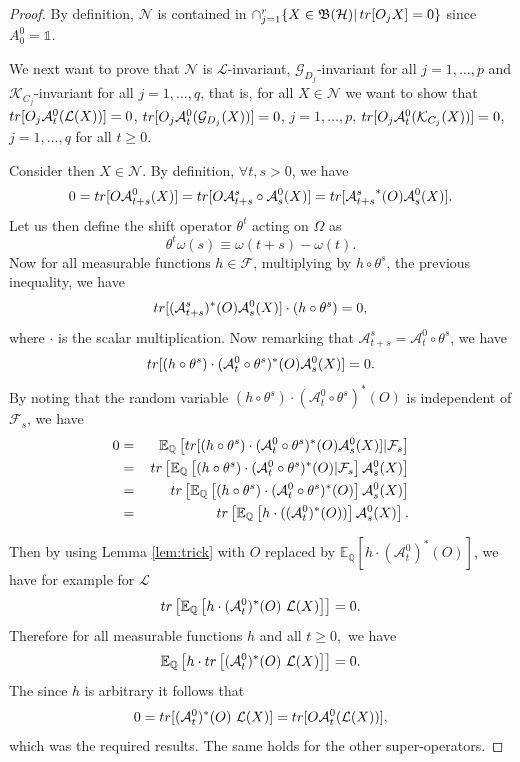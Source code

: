 \documentclass[aihp,12pt]{imsart}
\newcommand{\Gc}{\mathcal{G}}
\newcommand{\Hc}{\mathcal{H}}
\newcommand{\Kc}{\mathcal{K}}
\newcommand{\Lc}{\mathcal{L}}
\newcommand{\Ns}{\mathscr{N}}
\newcommand{\Bf}{\mathfrak{B}}
\newcommand{\one}{\mathbb{1}}
\newcommand{\tr}{{\rm tr}}
\theoremstyle{theorem}
\theoremstyle{definition}
\theoremstyle{remark}
\begin{document}
\begin{proof}
 By definition, $\Ns$ is contained in $\cap_{j=1}^r\{X\in\Bf(\Hc)|\, \tr[O_j X]=0\}$ since $A_{0}^0=\one$.

We next want to prove that $\Ns$ is $\Lc$-invariant, $\Gc_{D_j}$-invariant for all $j=1,\dots,p$ and $\Kc_{C_j}$-invariant for all $j=1,\dots,q$, that is, for all $X\in\Ns$ we want to show that $\tr[O_j\mathcal A_t^0(\Lc(X))]=0$, $\tr[O_j\mathcal A_t^0(\Gc_{D_j}(X))]=0$, $j=1,\ldots,p$, $\tr[O_j\mathcal A_t^0(\Kc_{C_j}(X))]=0$, $j=1,\ldots,q$  for all $t\geq0$.

Consider then $X\in\Ns$. By definition, $\forall t,s>0$,  we have 
    \begin{eqnarray*}
    0=\tr[O \mathcal A_{t+s}^0(X)]
    =\tr[O \mathcal A_{t+s}^s\circ{\mathcal A_s^0}(X)]
    =\tr[{\mathcal A_{t+s}^s}^* (O){\mathcal A_s^0}(X)].
    \end{eqnarray*} 
Let us then define the shift operator $\theta^t$ acting on $\Omega$ as
$$\theta^t\omega(s)\equiv\omega(t+s)-\omega(t).$$
Now for all measurable functions $h\in\mathcal F$, multiplying by $h\circ \theta^s$, the previous inequality, we have
   $$\tr[{(\mathcal A_{t+s}^s})^* (O){\mathcal A_s^0}(X)]\cdot(h\circ \theta^s)=0,$$
where $\cdot$ is the scalar multiplication.
Now remarking that $\mathcal A_{t+s}^s=\mathcal A_t^0\circ\theta^s$, we have
$$\tr[(h\circ \theta^s)\cdot({\mathcal A_t^0\circ\theta^s})^* (O)  {\mathcal A_s^0}(X)]=0.$$
By noting that the random variable $(h\circ \theta^s)\cdot({\mathcal A_t^0\circ\theta^s})^* (O)$  is independent of $\mathcal F_s$, we have
\begin{eqnarray*}
0&=\,&\mathbb E_{\mathbb Q}\left[\tr[(h\circ \theta^s)\cdot({\mathcal A_t^0\circ\theta^s})^* (O) {\mathcal A_s^0}(X)]\vert\mathcal F_s\right]\\
&=\,&\tr\left[\mathbb E_{\mathbb Q}\left[(h\circ \theta^s)\cdot({\mathcal A_t^0\circ\theta^s})^* (O)\vert \mathcal F_s\right] {\mathcal A_s^0}(X)\right]\\
&=\,&\tr\left[\mathbb E_{\mathbb Q}\left[(h\circ \theta^s)\cdot({\mathcal A_t^0\circ\theta^s})^* (O)\right] {\mathcal A_s^0}(X)\right]\\
&=\,& \tr\left[\mathbb E_{\mathbb Q}\left[h\cdot(({\mathcal A_t^0})^* (O))\right] {\mathcal A_s^0}(X)\right].
\end{eqnarray*}

Then by using Lemma \ref{lem:trick} with $O$ replaced by $\mathbb E_{\mathbb Q}\left[h\cdot({\mathcal A_t^0})^* (O)\right]$, we have for example for $\mathcal L$
$$\tr\left[\mathbb E_{\mathbb Q}\left[h\cdot({\mathcal A_t^0})^* (O)\,\,\mathcal L(X)\right]\right]=0.$$
Therefore for all measurable functions $h$ and all $t\geq 0,$ we have
$$\mathbb E_{\mathbb Q}\left[h\cdot\tr\left[({\mathcal A_t^0})^* (O)\,\,\mathcal L(X)\right]\right]=0.$$
The since $h$ is arbitrary it follows that
$$0=\tr[({\mathcal A_t^0})^* (O)\,\,\mathcal L(X)]=\tr[O\mathcal A_t^0 (\mathcal L(X))],$$
which was the required results. The same holds for the other super-operators.


\end{proof}
\end{document}
